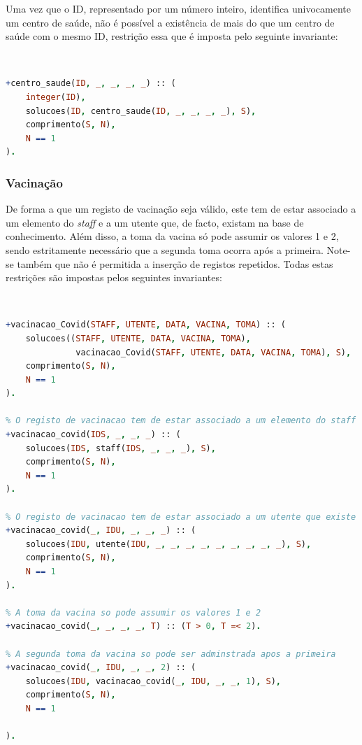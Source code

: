 \documentclass[a4paper, 11pt]{article}
\begin{document}
Uma vez que o ID, representado por um número inteiro, identifica univocamente um centro de saúde, não é possível a existência
de mais do que um centro de saúde com o mesmo ID, restrição essa que é imposta pelo seguinte invariante:

\

\begin{lstlisting}[language=Prolog, caption={Invariante de inserção relativo ao predicado \texttt{centro\_saude}}]
% O ID do centro de saude deve ser um numero inteiro e deve ser unico
+centro_saude(ID, _, _, _, _) :: (
    integer(ID),
    solucoes(ID, centro_saude(ID, _, _, _, _), S),
    comprimento(S, N),
    N == 1
).
\end{lstlisting}

\subsubsection*{Vacinação}

De forma a que um registo de vacinação seja válido, este tem de estar associado a um elemento do \textit{staff} e a um
utente que, de facto, existam na base de conhecimento. Além disso, a toma da vacina só pode assumir os valores 1 e 2,
sendo estritamente necessário que a segunda toma ocorra após a primeira. Note-se também que não é permitida a inserção de
registos repetidos. Todas estas restrições são impostas pelos seguintes invariantes:

\

\begin{lstlisting}[language=Prolog, caption={Invariantes de inserção relativos ao predicado \texttt{vacinacao\_covid}}]
% Nao permite a insercao de registos duplicados
+vacinacao_Covid(STAFF, UTENTE, DATA, VACINA, TOMA) :: (
    solucoes((STAFF, UTENTE, DATA, VACINA, TOMA),
              vacinacao_Covid(STAFF, UTENTE, DATA, VACINA, TOMA), S),
    comprimento(S, N),
    N == 1
).

% O registo de vacinacao tem de estar associado a um elemento do staff que exista
+vacinacao_covid(IDS, _, _, _) :: (
    solucoes(IDS, staff(IDS, _, _, _), S),
    comprimento(S, N),
    N == 1
).

% O registo de vacinacao tem de estar associado a um utente que existe
+vacinacao_covid(_, IDU, _, _, _) :: (
    solucoes(IDU, utente(IDU, _, _, _, _, _, _, _, _, _), S),
    comprimento(S, N),
    N == 1
).

% A toma da vacina so pode assumir os valores 1 e 2
+vacinacao_covid(_, _, _, _, T) :: (T > 0, T =< 2).

% A segunda toma da vacina so pode ser adminstrada apos a primeira
+vacinacao_covid(_, IDU, _, _, 2) :: (
    solucoes(IDU, vacinacao_covid(_, IDU, _, _, 1), S),
    comprimento(S, N),
    N == 1

).
\end{lstlisting}
\end{document}
